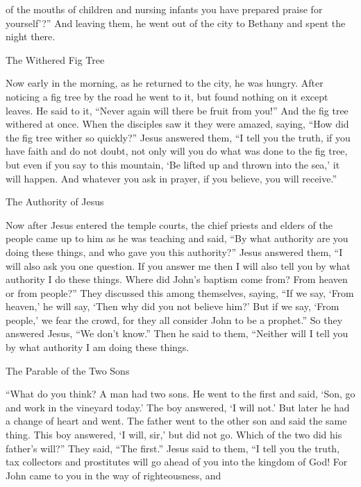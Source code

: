 {{{{{of
the mouths
of children
and
nursing infants
you have prepared
praise for yourself}}}}’?”
And
leaving
them,
he went out
of the city
to
Bethany
and
spent the night
there.
\par }{\SH The Withered Fig Tree
\par }{\PP {}Now
early in the morning,
as
he returned
to
the city,
he was hungry.
After noticing
a
fig tree
by
the road
he went
to
it,
but
found
nothing
on
it
except
leaves.
He
said
to it,
“Never again
will there be
fruit
from
you!” And
the fig tree
withered
at once.
When
the disciples
saw
it they were amazed,
saying,
“How
did
the fig tree
wither
so quickly?”
Jesus
answered
them,
“I tell
you
the truth,
if
you have
faith
and
do
not
doubt,
not
only
will you do
what was done
to the fig tree,
but
even if
you say
to this
mountain,
‘Be lifted up
and
thrown
into
the sea,’
it will happen.
And
whatever
you ask
in
prayer,
if you believe,
you will receive.”
\par }{\SH The Authority of Jesus
\par }{\PP {}Now
after
Jesus
entered
the temple courts,
the chief priests
and
elders
of the people
came up
to him
as he was teaching
and said,
“By
what
authority
are you doing
these things,
and
who
gave
you
this
authority?”
Jesus
answered
them,
“I
will
also
ask
you
one
question.
If
you answer
me
then I
will
also
tell
you
by
what
authority
I do
these things.
Where
did
John’s
baptism
come from? From
heaven
or
from
people?” They discussed
this among
themselves,
saying,
“If
we say,
‘From
heaven,’
he will say,
‘Then
why
did you
not
believe
him?’
But
if
we say,
‘From
people,’
we fear
the crowd,
for
they all
consider
John
to be
a prophet.”
So
they answered
Jesus, “We
don’t
know.”
Then he said
to them,
“Neither
will
I
tell
you
by
what
authority
I am doing
these things.
\par }{\SH The Parable of the Two Sons
\par }{\PP {}“What
do
you
think? A man
had
two
sons.
He went
to the first
and said,
‘Son,
go
and work
in
the vineyard
today.’
The boy answered, ‘I
will not.’
But later he had a change of heart and
went.
The father went
to the other son
and said
the same thing.
This boy answered, ‘I will,
sir,’ but did
not
go.
Which
of
the two
did
his father’s
will?” They said,
“The first.”
Jesus
said
to them,
“I tell
you
the truth,
tax collectors
and
prostitutes
will go ahead
of you
into
the kingdom
of God!
For
John
came
to
you
in
the way
of righteousness,
and
}
